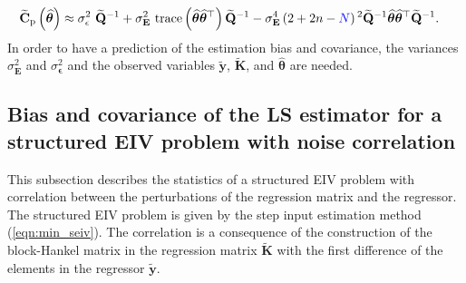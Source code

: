 \begin{equation} \begin{aligned} \widetilde{\mathbf{C}}_{\mathrm{p}} \left( \widehat{\bm{\theta}} \right) & \approx \sigma_\epsilon^2 \ \widetilde{\mathbf{Q}}^{-1} + \sigma_{\mathbf{E}}^2 \ \mathrm{trace} \left( \widehat{\bm{\theta}} \widehat{\bm{\theta}}^\top \right) \widetilde{\mathbf{Q}}^{-1} - \sigma_{\mathbf{E}}^4 \left( 2 + 2n - \color{blue}N\color{black} \right)^2 \widetilde{\mathbf{Q}}^{-1} \widehat{\bm{\theta}} \widehat{\bm{\theta}}^\top \widetilde{\mathbf{Q}}^{-1} . \end{aligned} \label{eqn:varEuST} \end{equation}
In order to have a prediction of the estimation bias and covariance, the variances $\sigma_{\mathbf{E}}^2$ and $\sigma_{\bm{\epsilon}}^2$ and the observed variables $\widetilde{\mathbf{y}}$, $\widetilde{\mathbf{K}}$, and $\widehat{\bm{\theta}}$ are needed.


\subsection{Bias and covariance of the LS estimator for a structured EIV problem with noise correlation}

This subsection describes the statistics of a structured EIV problem with correlation between the perturbations of the regression matrix and the regressor. 
The structured EIV problem is given by the step input estimation method (\ref{eqn:min_seiv}).
The correlation is a consequence of the construction of the block-Hankel matrix in the regression matrix $\widetilde{\mathbf{K}}$ with the first difference of the elements in the regressor $\widetilde{\mathbf{y}}$.

